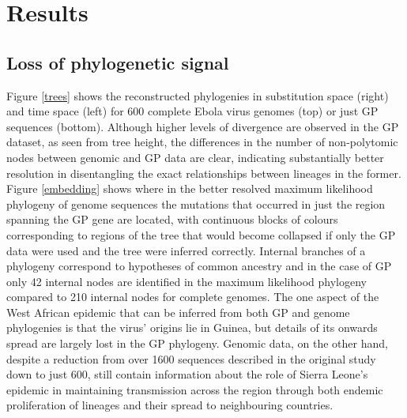 \documentclass{bmcart}
\begin{document}
\section*{Results}

\subsection*{Loss of phylogenetic signal}

Figure \ref{trees} shows the reconstructed phylogenies in substitution space (right) and time space (left) for 600 complete Ebola virus genomes (top) or just GP sequences (bottom).
Although higher levels of divergence are observed in the GP dataset, as seen from tree height, the differences in the number of non-polytomic nodes between genomic and GP data are clear, indicating substantially better resolution in disentangling the exact relationships between lineages in the former.
Figure \ref{embedding} shows where in the better resolved maximum likelihood phylogeny of genome sequences the mutations that occurred in just the region spanning the GP gene are located, with continuous blocks of colours corresponding to regions of the tree that would become collapsed if only the GP data were used and the tree were inferred correctly.
Internal branches of a phylogeny correspond to hypotheses of common ancestry and in the case of GP only 42 internal nodes are identified in the maximum likelihood phylogeny compared to 210 internal nodes for complete genomes.
The one aspect of the West African epidemic that can be inferred from both GP and genome phylogenies is that the virus' origins lie in Guinea, but details of its onwards spread are largely lost in the GP phylogeny.
Genomic data, on the other hand, despite a reduction from over 1600 sequences described in the original study \cite{dudas_virus_2017} down to just 600, still contain information about the role of Sierra Leone's epidemic in maintaining transmission across the region through both endemic proliferation of lineages and their spread to neighbouring countries.
\end{document}
